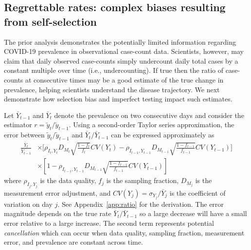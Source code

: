 \documentclass[11pt]{amsart}
\numberwithin{equation}{section}
\theoremstyle{plain}
\begin{document}

 \subsection{Regrettable rates: complex biases resulting from self-selection}
 \label{section:rates}

 The prior analysis demonstrates the potentially limited information regarding COVID-19 prevalence in observational case-count data.  Scientists, however, may claim that daily observed case-counts simply undercount daily total cases by a constant multiple over time (i.e., undercounting).  If true then the ratio of case-counts at consecutive times may be a good estimate of the true change in prevalence, helping scientists understand the disease trajectory.  We next demonstrate how selection bias and imperfect testing impact such estimates.

 Let $\bar Y_{t-1}$ and $\bar Y_{t}$ denote the prevalence on two consecutive days and consider the estimator $r = \tilde y_t / \tilde y_{t-1}$.  Using a second-order Taylor series approximation, the error between ${\tilde y_t}/{\tilde y_{t-1}}$ and ${\bar Y_{t}}/{\bar Y_{t-1}}$ can be expressed approximately as
 $$
 \begin{aligned}
 \frac{\bar Y_t}{\bar Y_{t-1}} &\times \bigg[ \rho_{I_t,Y_t} D_{M_t} \sqrt{\frac{1-f_t}{f_t}} CV (Y_t)  -\rho_{I_{t-1},Y_{t-1}} D_{M_{t-1}} \sqrt{\frac{1-f_{t-1}}{f_{t-1}}} CV (Y_{t-1}) \bigg] \\
 &\times \left[ 1 - \rho_{I_{t-1},Y_{t-1}} D_{M_{t-1}} \sqrt{\frac{1-f_{t-1}}{f_{t-1}}} CV (Y_{t-1}) \right]
 \end{aligned}
 $$
 where $\rho_{I_j, Y_j}$ is the data quality, $f_j$ is the sampling fraction, $D_{M_j}$ is the measurement error adjustment, and $CV(Y_j) = \sigma_{Y_j}/ \bar Y_j$ is the coefficient of variation on day $j$.  See Appendix~\ref{app:ratio} for the derivation. The error magnitude depends on the true rate $\bar Y_{t} / \bar Y_{t-1}$ so a large decrease will have a small error relative to a large increase. The second term represents potential \emph{cancellation} which can  occur when data quality, sampling fraction, measurement error, and prevalence are constant across time.
\end{document}
